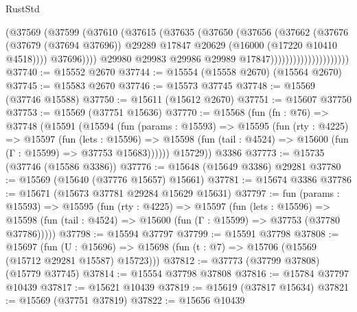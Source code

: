 \begin{lexlean}{RustStd}
\begin{coremodule}
                                        (@37569
                                          (@37599
                                            (@37610
                                              (@37615
                                                (@37635
                                                  (@37650
                                                    (@37656
                                                      (@37662
                                                        (@37676
                                                          (@37679 (@37694 @37696))
                                                          @29289
                                                          @17847
                                                          @20629
                                                          (@16000 (@17220 @10410 @4518))))
                                                      @37696))))
                                              @29980
                                              @29983
                                              @29986
                                              @29989
                                              @17847)))))))))))))))))))))
@37740 := @15552 @2670
@37744 := @15554 (@15558 @2670) (@15564 @2670)
@37745 := @15583 @2670
@37746 := @15573 @37745
@37748 := @15569 (@37746 @15588)
@37750 := @15611 (@15612 @2670)
@37751 := @15607 @37750
@37753 := @15569 (@37751 @15636)
@37770 := @15568
    (fun (fn : @76) =>
    @37748
      (@15591
        (@15594
          (fun (params : @15593) =>
          @15595
            (fun (rty : @4225) =>
            @15597
              (fun (lets : @15596) =>
              @15598 (fun (tail : @4524) => @15600 (fun (Γ : @15599) => @37753 @15683))))))
        @15729))
    @3386
@37773 := @15735 (@37746 (@15586 @3386))
@37776 := @15648 (@15649 @3386) @29281
@37780 := @15569 (@15640 (@37776 @15657) @15661)
@37781 := @15674 @3386
@37786 := @15671 (@15673 @37781 @29284 @15629 @15631)
@37797 := fun (params : @15593) =>
  @15595
    (fun (rty : @4225) =>
    @15597
      (fun (lets : @15596) =>
      @15598 (fun (tail : @4524) => @15600 (fun (Γ : @15599) => @37753 (@37780 @37786)))))
@37798 := @15594 @37797
@37799 := @15591 @37798
@37808 := @15697
    (fun (U : @15696) => @15698 (fun (t : @7) => @15706 (@15569 (@15712 @29281 @15587) @15723)))
@37812 := @37773 (@37799 @37808) (@15779 @37745)
@37814 := @15554 @37798 @37808
@37816 := @15784 @37797 @10439
@37817 := @15621 @10439
@37819 := @15619 (@37817 @15634)
@37821 := @15569 (@37751 @37819)
@37822 := @15656 @10439

\end{coremodule}
\end{lexlean}
